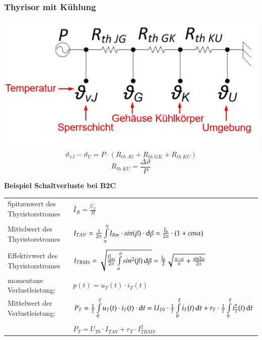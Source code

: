 \begin{multicols}{3}
\begin{minipage}{\linewidth}
		\subsubsection{Thyrisor mit Kühlung}
		\includegraphics[width=\linewidth]{images/thyrMK}
		\[ \vartheta_{vJ}-\vartheta_U=P \cdot (R_{th\; JG}+R_{th\; GK}+R_{th\; KU}) \]	
        \[ R_{th \; KU}=\dfrac{\Delta \vartheta}{P} \]
	\end{minipage}
\end{multicols}
\vspace{-1.5cm}
\textbf{Beispiel Schaltverluste bei B2C}\newline
\begin{tabular}{ll}
    Spitzenwert des Thyristorstromes&
    $\widehat{I}_{R} = \frac{\widehat{U}_{2}}{R}$\\
    \\
    
    Mittelwert des Thyristorstromes &
    $I_{T AV} = \frac{1}{2\pi}\int\limits_{\alpha}^{\pi}I_{Rm} \cdot sin(\beta) \cdot \mathop{}\!\mathrm{d}\beta= \frac{\hat{I}_{R}}{2\pi} \cdot (1+cos\alpha)$\\
    \\

    Effektivwert des Thyristorstromes &
    $I_{T RMS} = \sqrt{\frac{I_{RM}^2}{2\pi}\int\limits_{\alpha}^{\pi}sin^2(\beta)\mathop{}\!\mathrm{d}\beta}= \frac{\hat{I}_{R}}{2}\sqrt{\frac{\pi - \alpha}{\pi}+\frac{sin2\alpha}{2\pi}}$\\

    momentane Verlustleistung:&
    $p(t) = u_{T}(t) \cdot i_{T}(t)$\\
    Mittelwert der Verlustleistung: &
    $P_{T} = \frac{1}{T}\int\limits_{0}^{T}u_{T}(t) \cdot i_{T}(t) \cdot \mathop{}\!\mathrm{d} t = U_{T0} \cdot \frac{1}{T}\int\limits_{0}^{T}i_{T}(t)\mathop{}\!\mathrm{d} t+r_{T} \cdot \frac{1}{T}\int\limits_{0}^{T}i_{T}^2(t)\mathop{}\!\mathrm{d} t$\\
    \\
    & $P_{T} = U_{T0} \cdot I_{T AV} + r_{T} \cdot I_{T RMS}^2$\\[0.3cm]
\end{tabular}

